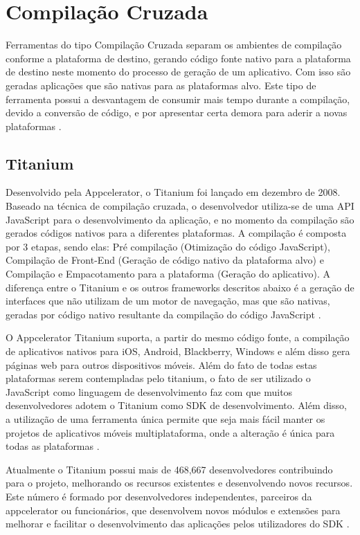 \section{Compilação Cruzada}
Ferramentas do tipo Compilação Cruzada separam os ambientes de compilação conforme a plataforma de destino, gerando código fonte nativo para a plataforma de destino neste momento do processo de geração de um aplicativo. Com isso são geradas aplicações que são nativas para as plataformas alvo. Este tipo de ferramenta possui a desvantagem de consumir mais tempo durante a compilação, devido a conversão de código, e por apresentar certa demora para aderir a novas plataformas
\cite{CrossPlatformMobileDevelopment2011}.

\subsection{Titanium}
Desenvolvido pela Appcelerator, o Titanium foi lançado em dezembro de 2008. Baseado na técnica de compilação cruzada, o desenvolvedor utiliza-se de uma API JavaScript para o desenvolvimento da aplicação, e no momento da compilação são gerados códigos nativos para a diferentes plataformas. A compilação é composta por 3 etapas, sendo elas: Pré compilação (Otimização do código JavaScript), Compilação de Front-End (Geração de código nativo da plataforma alvo) e Compilação e Empacotamento para a plataforma (Geração do aplicativo). A diferença entre o Titanium e os outros frameworks descritos abaixo é a geração de interfaces que não utilizam de um motor de navegação, mas que são nativas, geradas por código nativo resultante da compilação do código JavaScript
\cite{CrossPlatformMobileDevelopment2011}.

O Appcelerator Titanium suporta, a partir do mesmo código fonte, a compilação de aplicativos nativos para iOS, Android, Blackberry, Windows e além disso gera páginas web para outros dispositivos móveis. Além do fato de todas estas plataformas serem contempladas pelo titanium, o fato de ser utilizado o JavaScript como linguagem de desenvolvimento faz com que muitos desenvolvedores adotem o Titanium como SDK de desenvolvimento. Além disso, a utilização de uma ferramenta única permite que seja mais fácil manter os projetos de aplicativos móveis multiplataforma, onde a alteração é única para todas as plataformas \cite{appceleratorTitanium}.

Atualmente o Titanium possui mais de 468,667 desenvolvedores contribuindo para o projeto, melhorando os recursos existentes e desenvolvendo novos recursos. Este número é formado por desenvolvedores independentes, parceiros da appcelerator ou funcionários, que desenvolvem novos módulos e extensões para melhorar e facilitar o desenvolvimento das aplicações pelos utilizadores do SDK \cite{appceleratorTitanium}.

